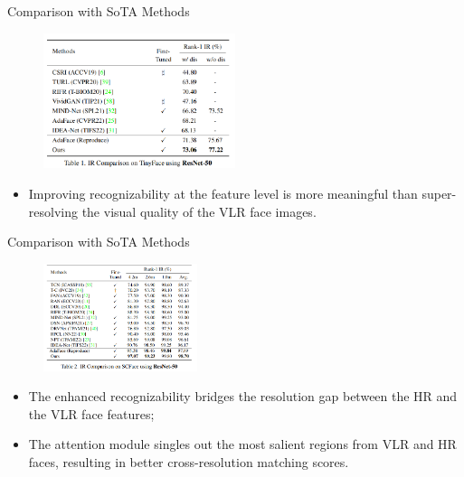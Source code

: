 \documentclass[aspectratio=169,xcolor=dvipsnames]{beamer}
\begin{document}

\begin{frame}{Comparison with SoTA Methods}
    \begin{figure}
        \centering
        \includegraphics[width=0.5\textwidth]{imgs/02_Table_1_TinyFace.png}
        \label{fig:t1-tinyface}
    \end{figure}
    \begin{itemize}
        \item Improving recognizability at the feature level is more meaningful than super-resolving the visual quality of the VLR face images.
    \end{itemize}
\end{frame}


\begin{frame}{Comparison with SoTA Methods}
    \begin{figure}
        \centering
        \includegraphics[width=0.4\textwidth]{imgs/03_Table_2_SCFace.png}
        \label{fig:t2-scface}
    \end{figure}
    \begin{itemize}
        \item The enhanced recognizability bridges the resolution gap between the HR and the VLR face features;
        \item The attention module singles out the most salient regions from VLR and HR faces, resulting in better cross-resolution matching scores.%
    \end{itemize}
\end{frame}
\end{document}
